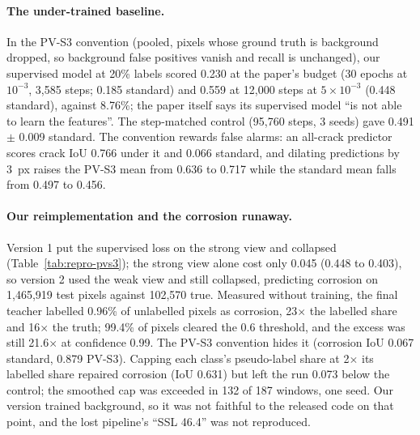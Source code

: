 \paragraph{The under-trained baseline.} In the PV-S3 convention (pooled, pixels whose ground truth is background dropped, so
background false positives vanish and recall is unchanged), our supervised model at 20\% labels scored 0.230 at the paper's budget (30
epochs at $10^{-3}$, 3,585 steps; 0.185 standard) and 0.559 at 12,000 steps at $5 \times 10^{-3}$ (0.448 standard), against 8.76\%;
the paper itself says its supervised model ``is not able to learn the features''. The step-matched control (95,760 steps, 3 seeds)
gave 0.491 $\pm$ 0.009 standard. The convention rewards false alarms: an all-crack predictor scores crack IoU 0.766 under it and 0.066
standard, and dilating predictions by 3~px raises the PV-S3 mean from 0.636 to 0.717 while the standard mean falls from 0.497 to 0.456.

\paragraph{Our reimplementation and the corrosion runaway.} Version 1 put the supervised loss on the strong view and collapsed
(Table~\ref{tab:repro-pvs3}); the strong view alone cost only 0.045 (0.448 to 0.403), so version 2 used the weak view and still
collapsed, predicting corrosion on 1,465,919 test pixels against 102,570 true. Measured without training, the final teacher labelled
0.96\% of unlabelled pixels as corrosion, 23$\times$ the labelled share and 16$\times$ the truth; 99.4\% of pixels cleared the 0.6
threshold, and the excess was still 21.6$\times$ at confidence 0.99. The PV-S3 convention hides it (corrosion IoU 0.067 standard, 0.879
PV-S3). Capping each class's pseudo-label share at 2$\times$ its labelled share repaired corrosion (IoU 0.631) but left the run 0.073
below the control; the smoothed cap was exceeded in 132 of 187 windows, one seed. Our version trained background, so it was not
faithful to the released code on that point, and the lost pipeline's ``SSL 46.4'' was not reproduced.

